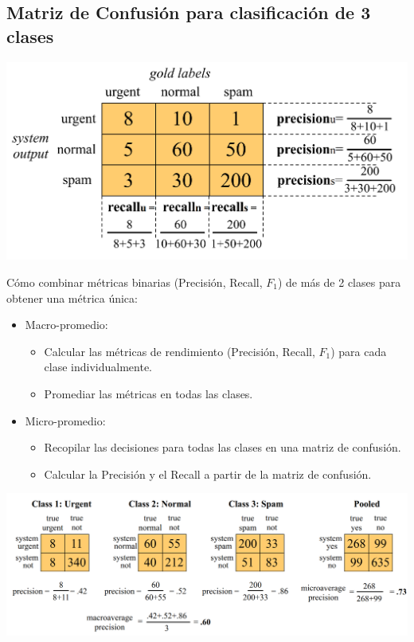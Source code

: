 \documentclass[11pt,fleqn]{book} %
\begin{document}
\subsection{Matriz de Confusión para clasificación de 3 clases}


\begin{center}
\includegraphics[scale=0.23]{pics/confmatrix.png}
\end{center}

Cómo combinar métricas binarias (Precisión, Recall, $F_1$) de más de 2 clases para obtener una métrica única:
\begin{itemize}
 \item Macro-promedio:
 \begin{itemize}
    \item Calcular las métricas de rendimiento (Precisión, Recall, $F_1$) para cada clase individualmente.
    \item Promediar las métricas en todas las clases.
 \end{itemize}
 \item Micro-promedio:
 \begin{itemize}
    \item Recopilar las decisiones para todas las clases en una matriz de confusión.
    \item Calcular la Precisión y el Recall a partir de la matriz de confusión.
 \end{itemize}
\end{itemize}

\begin{center}
\includegraphics[scale=0.23]{pics/confmatrixmulti.png}
\end{center}





\end{document}
